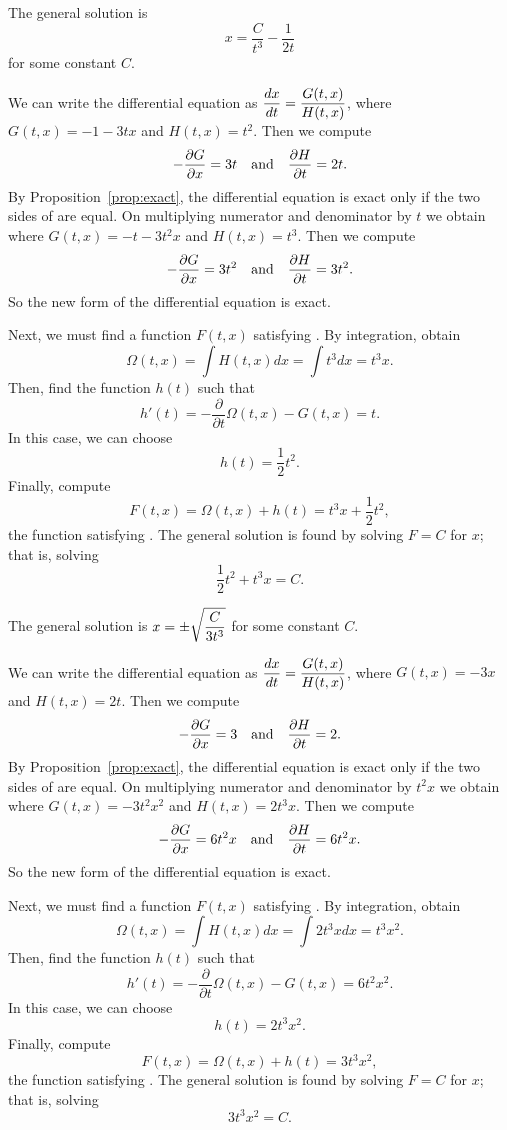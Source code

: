 \documentclass{ximera}
\begin{document}
 \ans The general solution is 
\[ x = \frac{C}{t^3} - \frac{1}{2t} \] 
for some constant $C$.

\soln We can write the differential equation as $\displaystyle\frac{dx}{dt} =
\frac{G(t,x)}{H(t,x)}$, where $G(t,x) = -1-3tx$ and $H(t,x) = t^2$. 
Then we compute
\[
-\frac{\partial G}{\partial x} = 3t \quad\mbox{and}\quad
\frac{\partial H}{\partial t} = 2t.
\]
By Proposition~\ref{prop:exact}, the
differential equation is exact only if the two sides of  are
equal.
On multiplying numerator and denominator by $t$ we obtain
where $G(t,x) = -t-3t^2x$ and $H(t,x) = t^3$. 
Then we compute
\[
-\frac{\partial G}{\partial x} = 3t^2 \quad\mbox{and}\quad
\frac{\partial H}{\partial t} = 3t^2.
\]
So the new form of the differential equation is exact.

Next, we must find a function $F(t,x)$ satisfying .
By integration, obtain
\[
\Omega(t,x) = \int H(t,x)dx = \int t^3dx = t^3x.
\]
Then, find the function $h(t)$ such that
\[
h'(t) = -\frac{\partial}{\partial t}\Omega(t,x) - G(t,x)
= t.
\]
In this case, we can choose 
\[
h(t) =  \frac{1}{2}t^2.  
\]
Finally, compute
\[
F(t,x) = \Omega(t,x) + h(t) = t^3x + \frac{1}{2}t^2,
\]
the function satisfying .  The general solution is found by 
solving $F=C$ for $x$; that is, solving
\[
\frac{1}{2}t^2 + t^3x = C.
\]

 \ans The general solution is $x = \displaystyle\pm\sqrt{\frac{C}{3t^3}}$ 
for some constant $C$.

\soln We can write the differential equation as $\displaystyle\frac{dx}{dt} =
\frac{G(t,x)}{H(t,x)}$, where $G(t,x) = -3x$ and $H(t,x) = 2t$. 
Then we compute
\[
-\frac{\partial G}{\partial x} = 3 \quad\mbox{and}\quad
\frac{\partial H}{\partial t} = 2.
\]
By Proposition~\ref{prop:exact}, the differential equation is exact only
if the two sides of  are equal.
On multiplying numerator and denominator by $t^2x$ we obtain
where $G(t,x) = -3t^2x^2$ and $H(t,x) = 2t^3x$. 
Then we compute
\[
-\frac{\partial G}{\partial x} = 6t^2x \quad\mbox{and}\quad
\frac{\partial H}{\partial t} = 6t^2x.
\]
So the new form of the differential equation is exact.

Next, we must find a function $F(t,x)$ satisfying .  By
integration, obtain
\[
\Omega(t,x) = \int H(t,x)dx = \int 2t^3xdx = t^3x^2.
\]
Then, find the function $h(t)$ such that
\[
h'(t) = -\frac{\partial}{\partial t}\Omega(t,x) - G(t,x)
= 6t^2x^2.
\]
In this case, we can choose 
\[
h(t) =  2t^3x^2.  
\]
Finally, compute
\[
F(t,x) = \Omega(t,x) + h(t) = 3t^3x^2,
\]
the function satisfying .  The general solution is found by 
solving $F=C$ for $x$; that is, solving
\[
3t^3x^2 = C.
\]
\end{document}
